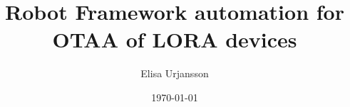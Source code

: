 
\def\thesislang{english} %

\def\secondlang{finnish} %

\author{Elisa Urjansson} %
\def\thesisfi{Insinöörityö}%
\def\thesisen{Thesis}

\def\alaotsikko{Alaotsikko/Subtitle} %

\def\otsikko{LoRa laitteiden autentikaation automatisointi langattomasti Robot Frameworkilla}
\def\tutkinto{Insinööri (AMK)} %
\def\kohjelma{Tieto\textendash ja viestintätekniikka}
\def\suuntautumis{Älykkäät järjestelmät}
\def\ohjaajat{
Projekti-insinööri Joseph Hotchkiss\newline
}
\def\avainsanat{avainsanat}
\def\pvm{\specialdate\today}

\title{Robot Framework automation for OTAA of LORA devices}
\def\metropoliadegree {Bachelor of Engineering} %
\def\metropoliadegreeprogramme {Information and Communication Technology}
\def\metropoliaspecialisation {Smart Systems}
\def\metropoliainstructors {
Joseph Hotchkiss, Project Engineer\newline
}
\def\metropoliakeywords {Keywords}
\date{\longmonth\today}


